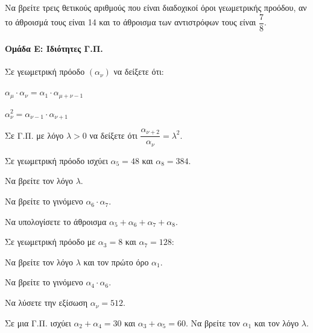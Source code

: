 \documentclass[11pt,a4paper,modern]{FFExercises}
\begin{document}
\askhsh
Να βρείτε τρεις θετικούς αριθμούς που είναι διαδοχικοί όροι γεωμετρικής προόδου, αν το άθροισμά τους είναι 14 και το άθροισμα των αντιστρόφων τους είναι $\dfrac{7}{8}$.


\paragraph{Ομάδα Ε: Ιδιότητες Γ.Π.}

\askhsh
Σε γεωμετρική πρόοδο $(\alpha_\nu)$ να δείξετε ότι:
\begin{alist}
  \item $\alpha_\mu \cdot \alpha_\nu = \alpha_1 \cdot \alpha_{\mu+\nu-1}$
  \item $\alpha_\nu^2 = \alpha_{\nu-1} \cdot \alpha_{\nu+1}$
\end{alist}

\askhsh
Σε Γ.Π. με λόγο $\lambda > 0$ να δείξετε ότι $\dfrac{\alpha_{\nu+2}}{\alpha_\nu} = \lambda^2$.

\askhsh
Σε γεωμετρική πρόοδο ισχύει $\alpha_5 = 48$ και $\alpha_8 = 384$.
\begin{alist}
  \item Να βρείτε τον λόγο $\lambda$.
  \item Να βρείτε το γινόμενο $\alpha_6 \cdot \alpha_7$.
  \item Να υπολογίσετε το άθροισμα $\alpha_5 + \alpha_6 + \alpha_7 + \alpha_8$.
\end{alist}

\askhsh
Σε γεωμετρική πρόοδο με $\alpha_3 = 8$ και $\alpha_7 = 128$:
\begin{alist}
  \item Να βρείτε τον λόγο $\lambda$ και τον πρώτο όρο $\alpha_1$.
  \item Να βρείτε το γινόμενο $\alpha_4 \cdot \alpha_6$.
  \item Να λύσετε την εξίσωση $\alpha_\nu = 512$.
\end{alist}

\askhsh
Σε μια Γ.Π. ισχύει $\alpha_2 + \alpha_4 = 30$ και $\alpha_3 + \alpha_5 = 60$. Να βρείτε τον $\alpha_1$ και τον λόγο $\lambda$.

\end{document}
